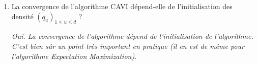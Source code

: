 \documentclass[a4paper,10pt,fleqn]{article}
\newcommand{\1}{\ensuremath{\mathbbm{1}}}
\begin{document}
\begin{enumerate}
\vspace{.2cm}

{\em
Il suffit d'\'ecrire, pour $1\leq j\leq d$, la fonction $z_j \mapsto \exp\{\mathbb{E}_{-j}[\log p (z_{j},Z_{-j},x)]\}$ en utilisant la forme exponentielle de l'\'enonc\'e et de supprimer les termes multiplicatifs ne d\'ependants pas de $z_j$.
}
\item La convergence de l'algorithme CAVI  d\'epend-elle de l'initialisation des densit\'e $(q_u)_{1\leqslant u\leqslant d}$ ?

\vspace{.2cm}

{\em
Oui. La convergence de l'algorithme d\'epend de l'initialisation de l'algorithme. C'est bien s\^ur un point tr\`es important en pratique (il en est de m\^eme pour l'algorithme Expectation Maximization).
}
\end{enumerate}
\end{document}
